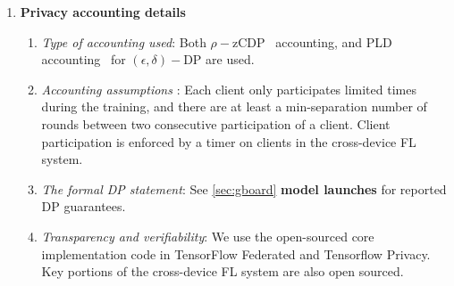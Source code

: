 \begin{enumerate}
\begin{enumerate}
    \end{enumerate}
    \item \textbf{Privacy accounting details}
    \begin{enumerate}
        \item \textit{Type of accounting used}: Both $\rho-$zCDP~\citep{bun2016concentrated} accounting, and PLD accounting~\citep{pldlib} for $(\epsilon, \delta)-$DP are used.
        \item \textit{Accounting assumptions }: Each client only participates limited times during the training, and there are at least a min-separation number of rounds between two consecutive participation of a client. Client participation is enforced by a timer on clients in the cross-device FL system.    
        \item \textit{The formal DP statement}: See \cref{sec:gboard} \textbf{model launches} for reported DP guarantees.
        \item \textit{Transparency and verifiability}: We use the open-sourced core implementation code in TensorFlow Federated and Tensorflow Privacy. Key portions of the cross-device FL system are also open sourced.
    \end{enumerate}
\end{enumerate}